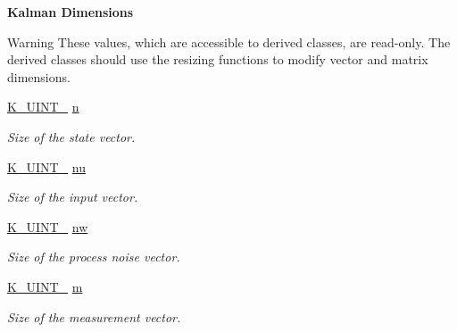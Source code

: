 \begin{Indent}\textbf{ Kalman Dimensions}\par
{\em \begin{DoxyWarning}{Warning}
These values, which are accessible to derived classes, are read-\/only. The derived classes should use the resizing functions to modify vector and matrix dimensions. 
\end{DoxyWarning}
}\begin{DoxyCompactItemize}
\item 
\mbox{\label{classKalman_1_1EKFilter_a6bfb25c8cd793856593b25054cbc3da8}} 
\mbox{\hyperlink{namespaceKalman_a628a50cae10f6e2035393d4f96c698bd}{K\+\_\+\+U\+I\+N\+T\+\_}} \mbox{\hyperlink{classKalman_1_1EKFilter_a6bfb25c8cd793856593b25054cbc3da8}{n}}
\begin{DoxyCompactList}\small\item\em Size of the state vector. \end{DoxyCompactList}\item 
\mbox{\label{classKalman_1_1EKFilter_ac1b71009af5616611d8dd775084e2237}} 
\mbox{\hyperlink{namespaceKalman_a628a50cae10f6e2035393d4f96c698bd}{K\+\_\+\+U\+I\+N\+T\+\_}} \mbox{\hyperlink{classKalman_1_1EKFilter_ac1b71009af5616611d8dd775084e2237}{nu}}
\begin{DoxyCompactList}\small\item\em Size of the input vector. \end{DoxyCompactList}\item 
\mbox{\label{classKalman_1_1EKFilter_a93c465859315350239341b7242c721f9}} 
\mbox{\hyperlink{namespaceKalman_a628a50cae10f6e2035393d4f96c698bd}{K\+\_\+\+U\+I\+N\+T\+\_}} \mbox{\hyperlink{classKalman_1_1EKFilter_a93c465859315350239341b7242c721f9}{nw}}
\begin{DoxyCompactList}\small\item\em Size of the process noise vector. \end{DoxyCompactList}\item 
\mbox{\label{classKalman_1_1EKFilter_afa8dc375c7bed34028a45b17514c88fc}} 
\mbox{\hyperlink{namespaceKalman_a628a50cae10f6e2035393d4f96c698bd}{K\+\_\+\+U\+I\+N\+T\+\_}} \mbox{\hyperlink{classKalman_1_1EKFilter_afa8dc375c7bed34028a45b17514c88fc}{m}}
\begin{DoxyCompactList}\small\item\em Size of the measurement vector. \end{DoxyCompactList}\item 

\end{DoxyCompactItemize}
\end{Indent}
